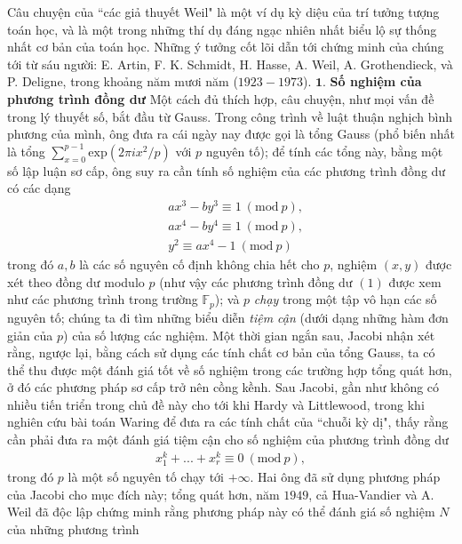 \vspace*{180pt}

\begin{multicols}{2}	
	Câu chuyện của ``các giả thuyết Weil" là một ví dụ kỳ diệu của trí tưởng tượng toán học, và là một trong những thí dụ đáng ngạc nhiên nhất biểu lộ sự thống nhất cơ bản của toán học. Những ý tưởng cốt lõi dẫn tới chứng minh của chúng tới từ sáu người: E. Artin, F. K. Schmidt, H. Hasse, A. Weil, A. Grothendieck, và P. Deligne, trong khoảng năm mươi năm ($1923-1973$).
	\vskip 0.1cm
	$\pmb{1.}$ \textbf{\color{duongvaotoanhoc}Số nghiệm của phương trình đồng dư}
	\vskip 0.1cm
	Một cách đủ thích hợp, câu chuyện, như mọi vấn đề trong lý thuyết số, bắt đầu từ Gauss. Trong công trình về luật thuận nghịch bình phương của mình, ông đưa ra cái ngày nay được gọi là tổng Gauss (phổ biến nhất là tổng $\sum_{x=0}^{p-1} \mathrm{exp}(2\pi i x^2/p)$ với $p$ nguyên tố); để tính các tổng này, bằng một số lập luận sơ cấp, ông suy ra cần tính số nghiệm của các phương trình đồng dư có các dạng 
	\begin{align*}
			&ax^3 - by^3 \equiv 1 \ (\mathrm{mod} \ p),\\ 
			& ax^4 - by^4 \equiv 1 \ (\mathrm{mod} \ p), \tag{$1$}\\ 
			&y^2 \equiv ax^4 - 1 \ (\mathrm{mod} \ p)  
	\end{align*}
	trong đó $a,b$ là các số nguyên cố định không chia hết cho $p$, nghiệm $(x,y)$ được xét theo đồng dư modulo $p$ (như vậy các phương trình đồng dư $(1)$ được xem như các phương trình trong trường $\mathbb{F}_p$); và $p$ \textit{chạy} trong một tập vô hạn các số nguyên tố; chúng ta đi tìm những biểu diễn \textit{tiệm cận} (dưới dạng những hàm đơn giản của $p$) của số lượng các nghiệm. Một thời gian ngắn sau, Jacobi nhận xét rằng, ngược lại, bằng cách sử dụng các tính chất cơ bản của tổng Gauss, ta có thể thu được một đánh giá tốt về số nghiệm trong các trường hợp tổng quát hơn, ở đó các phương pháp sơ cấp trở nên cồng kềnh. Sau Jacobi, gần như không có nhiều tiến triển trong chủ đề này cho tới khi Hardy và Littlewood, trong khi nghiên cứu bài toán Waring để đưa ra các tính chất của ``chuỗi kỳ dị", thấy rằng cần phải đưa ra một đánh giá tiệm cận cho số nghiệm của phương trình đồng dư
	\begin{align*}
		x_1^k + ... + x_r^k \equiv 0 \ (\mathrm{mod} \ p), \tag{$2$}
	\end{align*}
	trong đó $p$ là một số nguyên tố chạy tới $+\infty$. Hai ông đã sử dụng phương pháp của Jacobi cho mục đích này; tổng quát hơn, năm $1949$, cả Hua-Vandier và A. Weil đã độc lập chứng minh rằng phương pháp này có thể đánh giá số nghiệm $N$ của những phương trình

\end{multicols}
